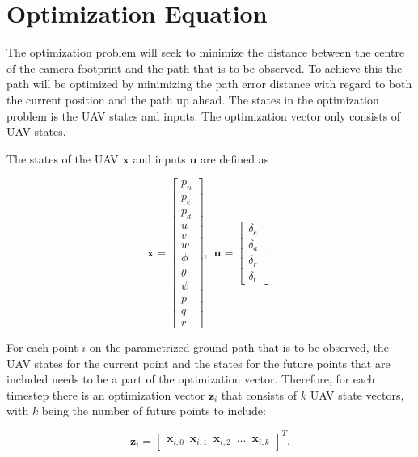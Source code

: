 \section*{Optimization Equation}

The optimization problem will seek to minimize the distance between the centre of the camera footprint and the path that is to be observed. To achieve this the path will be optimized by minimizing the path error distance with regard to both the current position and the path up ahead. The states in the optimization problem is the UAV states and inputs. The optimization vector only consists of UAV states.

The states of the UAV $\mathbf{x}$ and inputs $\mathbf{u}$ are defined as

\begin{equation}
	\mathbf{x} = 
	\begin{bmatrix}
		p_n 	\\ p_e		\\ p_d	\\
		u 		\\ v   		\\ w 	\\ 
		\phi	\\ \theta	\\ \psi	\\
		p		\\ q		\\ r
	\end{bmatrix}, \hspace{5pt}
	\mathbf{u} = 
	\begin{bmatrix}
		\delta_e\\ \delta_a	\\ \delta_r	\\ \delta_t
	\end{bmatrix}.
\end{equation}

For each point $i$ on the parametrized ground path that is to be observed, the UAV states for the current point and the states for the future points that are included needs to be a part of the optimization vector. Therefore, for each timestep there is an optimization vector $\mathbf{z}_i$ that consists of $k$ UAV state vectors, with $k$ being the number of future points to include:

\begin{equation}
	\mathbf{z}_i =
	\begin{bmatrix}
		\mathbf{x}_{i,0} \hspace{6pt} \mathbf{x}_{i,1} \hspace{6pt} \mathbf{x}_{i,2} \hspace{6pt} \hdots \hspace{6pt} \mathbf{x}_{i,k}
	\end{bmatrix}^T.
\end{equation}

